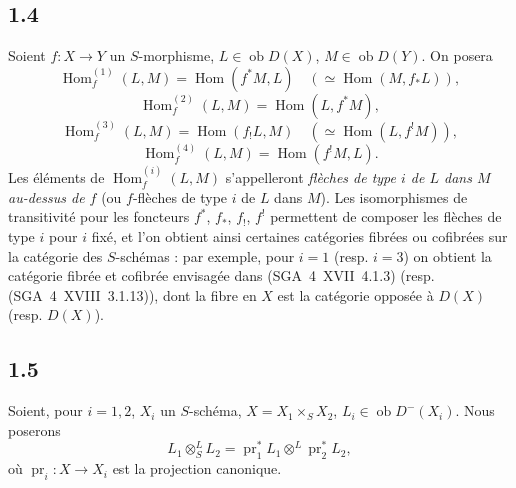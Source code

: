 \documentclass[11pt]{article}
\DeclareMathOperator{\Hom}{Hom}
\newcommand{\ob}{\operatorname{ob}}
\providecommand{\pr}{\operatorname{pr}}
\providecommand{\Hom}{\operatorname{Hom}}
\providecommand{\ob}{\operatorname{ob}}
\providecommand{\pr}{\operatorname{pr}}
\begin{document}
\subsection*{1.4}
Soient $f:X\to Y$ un $S$-morphisme, $L\in\ob D(X)$, $M\in\ob D(Y)$. On posera
\[
\Hom_f^{(1)}(L,M)=\Hom(f^{*}M,L)\quad (\simeq \Hom(M,f_{*}L)),
\]
\[
\Hom_f^{(2)}(L,M)=\Hom(L,f^{*}M),
\]
\[
\Hom_f^{(3)}(L,M)=\Hom(f_{!}L,M)\quad (\simeq \Hom(L,f^{!}M)),
\]
\[
\Hom_f^{(4)}(L,M)=\Hom(f^{!}M,L).
\]
Les éléments de $\Hom_f^{(i)}(L,M)$ s'appelleront \emph{flèches de type $i$ de $L$ dans $M$ au-dessus de $f$} (ou $f$-flèches de type $i$ de $L$ dans $M$). Les isomorphismes de transitivité pour les foncteurs $f^{*}$, $f_{*}$, $f_{!}$, $f^{!}$ permettent de composer les flèches de type $i$ pour $i$ fixé, et l'on obtient ainsi certaines catégories fibrées ou cofibrées sur la catégorie des $S$-schémas : par exemple, pour $i=1$ (resp. $i=3$) on obtient la catégorie fibrée et cofibrée envisagée dans (SGA~4~XVII~4.1.3) (resp. (SGA~4~XVIII~3.1.13)), dont la fibre en $X$ est la catégorie opposée à $D(X)$ (resp. $D(X)$).

\subsection*{1.5}
Soient, pour $i=1,2$, $X_i$ un $S$-schéma, $X=X_1\times_S X_2$, $L_i\in\ob D^{-}(X_i)$. Nous poserons
\[
L_1\otimes^{L}_{S}L_2=\pr_1^{*}L_1\otimes^{L}\pr_2^{*}L_2,
\]
où $\pr_i:X\to X_i$ est la projection canonique.
\end{document}

